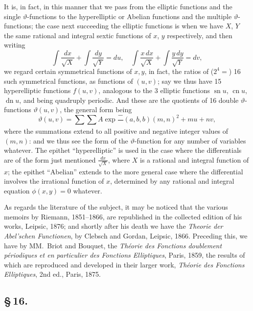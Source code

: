 \documentclass[11pt,a4paper]{article}
\DeclareMathOperator{\sn}{sn}
\DeclareMathOperator{\cn}{cn}
\DeclareMathOperator{\dn}{dn}
\begin{document}
It is, in fact, in this manner that we pass from the elliptic functions and the single $\vartheta$-functions to the hyperelliptic or Abelian functions and the multiple $\vartheta$-functions; the case next succeeding the elliptic functions is when we have $X$, $Y$ the same rational and integral sextic functions of $x$, $y$ respectively, and then writing
\[
\int\frac{dx}{\sqrt{X}} + \int\frac{dy}{\sqrt{Y}} = du, \quad
\int\frac{x\,dx}{\sqrt{X}} + \int\frac{y\,dy}{\sqrt{Y}} = dv,
\]
we regard certain symmetrical functions of $x, y$, in fact, the ratios of ($2^{4} =$) 16 such symmetrical functions, as functions of $(u, v)$; say we thus have 15 hyperelliptic functions $f(u, v)$, analogous to the 3 elliptic functions $\sn u$, $\cn u$, $\dn u$, and being quadruply periodic. And these are the quotients of 16 double $\vartheta$-functions $\vartheta(u, v)$, the general form being
\[
\vartheta(u, v) = \sum\sum A\exp\frac{-}{}(a, b, b)(m, n)^{2} + mu + nv,
\]
where the summations extend to all positive and negative integer values of $(m, n)$: and we thus see the form of the $\vartheta$-function for any number of variables whatever. The epithet ``hyperelliptic'' is used in the case where the differentials are of the form just mentioned $\frac{dx}{\sqrt{X}}$, where $X$ is a rational and integral function of $x$; the epithet ``Abelian'' extends to the more general case where the differential involves the irrational function of $x$, determined by any rational and integral equation $\phi(x, y) = 0$ whatever.

As regards the literature of the subject, it may be noticed that the various memoirs by Riemann, 1851--1866, are republished in the collected edition of his works, Leipsic, 1876; and shortly after his death we have the \textit{Theorie der Abel'schen Functionen}, by Clebsch and Gordan, Leipsic, 1866. Preceding this, we have by MM.\ Briot and Bouquet, the \textit{Th\'{e}orie des Fonctions doublement p\'{e}riodiques et en particulier des Fonctions Elliptiques}, Paris, 1859, the results of which are reproduced and developed in their larger work, \textit{Th\'{e}orie des Fonctions Elliptiques}, 2nd ed., Paris, 1875.

\subsection*{\S\,16.}
\end{document}
